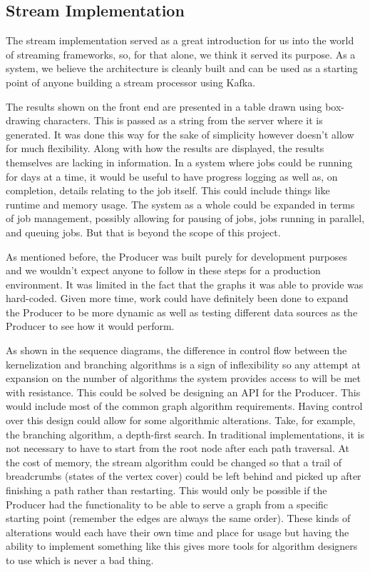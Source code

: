 \subsection{Stream Implementation}

The stream implementation served as a great introduction for us into the
world of streaming frameworks, so, for that alone, we think it served
its purpose. As a system, we believe the architecture is cleanly built
and can be used as a starting point of anyone building a stream
processor using Kafka.

The results shown on the front end are presented in a table drawn using
box-drawing characters. This is passed as a string from the server where
it is generated. It was done this way for the sake of simplicity however
doesn't allow for much flexibility. Along with how the results are
displayed, the results themselves are lacking in information. In a
system where jobs could be running for days at a time, it would be
useful to have progress logging as well as, on completion, details
relating to the job itself. This could include things like runtime and
memory usage. The system as a whole could be expanded in terms of job
management, possibly allowing for pausing of jobs, jobs running in
parallel, and queuing jobs. But that is beyond the scope of this
project.

As mentioned before, the Producer was built purely for development
purposes and we wouldn't expect anyone to follow in these steps for a
production environment. It was limited in the fact that the graphs it
was able to provide was hard-coded. Given more time, work could have
definitely been done to expand the Producer to be more dynamic as well
as testing different data sources as the Producer to see how it would
perform.

As shown in the sequence diagrams, the difference in control flow
between the kernelization and branching algorithms is a sign of
inflexibility so any attempt at expansion on the number of algorithms
the system provides access to will be met with resistance. This could be
solved be designing an API for the Producer. This would include most of
the common graph algorithm requirements. Having control over this design
could allow for some algorithmic alterations. Take, for example, the
branching algorithm, a depth-first search. In traditional
implementations, it is not necessary to have to start from the root node
after each path traversal. At the cost of memory, the stream algorithm
could be changed so that a trail of breadcrumbs (states of the vertex
cover) could be left behind and picked up after finishing a path rather
than restarting. This would only be possible if the Producer had the
functionality to be able to serve a graph from a specific starting point
(remember the edges are always the same order). These kinds of
alterations would each have their own time and place for usage but
having the ability to implement something like this gives more tools for
algorithm designers to use which is never a bad thing.